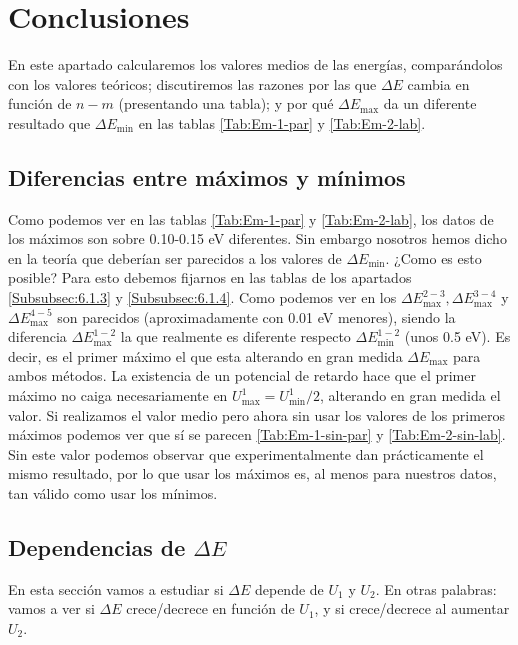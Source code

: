 \documentclass[12pt,a4paper]{article}
\numberwithin{equation}{section}
\numberwithin{figure}{section}
\begin{document}
\section{Conclusiones}

En este apartado calcularemos los valores medios de las energías, comparándolos con los valores teóricos; discutiremos las razones por las que $\Delta E$ cambia en función de $n-m$ (presentando una tabla); y por qué $\Delta E_{\max}$ da un diferente resultado que $\Delta E_{\min}$ en las tablas  \ref{Tab:Em-1-par} y \ref{Tab:Em-2-lab}.  \\

\subsection{Diferencias entre máximos y mínimos}


Como podemos ver en las tablas \ref{Tab:Em-1-par} y \ref{Tab:Em-2-lab}, los datos de los máximos son sobre 0.10-0.15 eV diferentes. Sin embargo nosotros hemos dicho en la teoría que deberían ser parecidos a los valores de $\Delta E_{\min}$. ¿Como es esto posible? Para esto debemos fijarnos en las tablas de los apartados \ref{Subsubsec:6.1.3} y  \ref{Subsubsec:6.1.4}. Como podemos ver en los $\Delta E_{\max}^{2-3}, \Delta E_{\max}^{3-4}$ y $\Delta E_{\max}^{4-5}$ son parecidos (aproximadamente con 0.01 eV menores), siendo la diferencia $\Delta E_{\max}^{1-2}$ la que realmente es diferente respecto $\Delta E_{\min}^{1-2}$ (unos 0.5 eV). Es decir, es el primer máximo el que esta alterando en gran medida $\Delta E_{\max}$ para ambos métodos. La existencia de un potencial de retardo hace que el primer máximo no caiga necesariamente en $U_{\max}^1=U_{\min}^1/2$, alterando en gran medida el valor. Si realizamos el valor medio pero ahora sin usar los valores de los primeros máximos podemos ver que sí se parecen \ref{Tab:Em-1-sin-par} y \ref{Tab:Em-2-sin-lab}. Sin este valor podemos observar que experimentalmente dan prácticamente el mismo resultado, por lo que usar los máximos es, al menos para nuestros datos, tan válido como usar los mínimos.


\subsection{Dependencias de $\Delta E$}

En esta sección vamos a estudiar si $\Delta E$ depende de $U_1$ y $U_2$. En otras palabras: vamos a ver si $\Delta E$ crece/decrece en función de $U_1$, y si crece/decrece al aumentar $U_2$. \\
\end{document}
